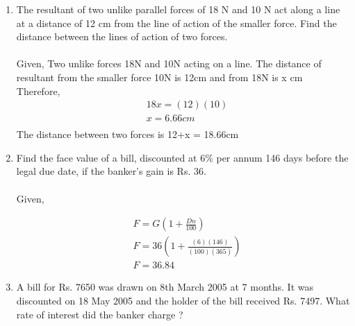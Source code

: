 \documentclass[journal,12pt,twocolumn]{IEEEtran}
\renewcommand\thesection{\arabic{section}}
\begin{document}
\begin{enumerate}[label=\thesection.\arabic*.,ref=\thesection.\theenumi]
\begin{align}
&R = \dfrac{u^2\sin 2\theta}{g}\\
&\theta = \dfrac{1}{2}\sin^{-1}\left(\dfrac{Rg}{u^2}\right)\\
&\theta = 15\degree
\end{align}
Therefore angle of projection are 15\degree and 75\degree.
\item The resultant of two unlike parallel forces of 18 N and 10 N act along a line at a distance of 12 cm from the line of action of the smaller force. Find the distance between the lines of action of two forces.\\
\solution\\
Given, Two unlike forces 18N and 10N acting on a line. The distance of resultant from the smaller force 10N is 12cm and from 18N is x cm\\
Therefore,
\begin{align}
&18x = (12)(10)\\
&x = 6.66cm\\
\end{align}
The distance between two forces is 12+x = 18.66cm\\
\item Find the face value of a bill, discounted at 6\% per annum 146 days before the legal due date, if the banker's gain is Rs. 36.\\
\solution \\
Given,
\begin{table}[ht]
 \centering
 \caption{}
 \end{table}
 \begin{align}
& F = G\left(1+\displaystyle\frac{Dn}{100}\right)\\
 & F =36\left(1+\displaystyle\frac{(6)(146)}{(100)(365)}\right)\\
 &F = 36.84
 \end{align}
 \item A bill for Rs. 7650 was drawn on 8th March 2005 at 7 months. It was discounted on 18 May 2005 and the holder of the bill received Rs. 7497. What rate of interest did the banker charge ?\\

\end{enumerate}
\end{document}
